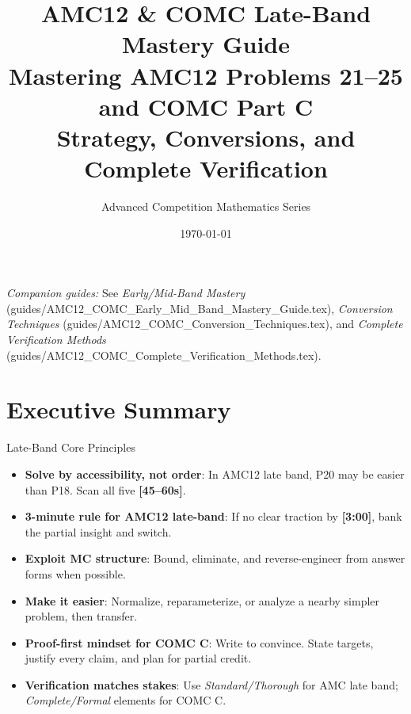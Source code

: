 \documentclass{article}
\title{\textbf{AMC12 \& COMC Late-Band Mastery Guide}\\
\Large Mastering AMC12 Problems 21--25 and COMC Part C\\
\large Strategy, Conversions, and Complete Verification}
\author{Advanced Competition Mathematics Series}
\date{\today}
\newcommand{\timetarget}[1]{\textcolor{timingblue}{\textbf{[#1]}}}
\begin{document}
\maketitle

\begin{center}
\end{center}

\vspace{0.5em}
\noindent\textit{Companion guides:} See \emph{Early/Mid-Band Mastery} (guides/AMC12\_COMC\_Early\_Mid\_Band\_Mastery\_Guide.tex), \emph{Conversion Techniques} (guides/AMC12\_COMC\_Conversion\_Techniques.tex), and \emph{Complete Verification Methods} (guides/AMC12\_COMC\_Complete\_Verification\_Methods.tex).

\tableofcontents
\newpage

\section{Executive Summary}

\begin{strategybox}{Late-Band Core Principles}
\begin{itemize}[nosep]
\item \textbf{Solve by accessibility, not order}: In AMC12 late band, P20 may be easier than P18. Scan all five \timetarget{45--60s}.
\item \textbf{3-minute rule for AMC12 late-band}: If no clear traction by \timetarget{3:00}, bank the partial insight and switch.
\item \textbf{Exploit MC structure}: Bound, eliminate, and reverse-engineer from answer forms when possible.
\item \textbf{Make it easier}: Normalize, reparameterize, or analyze a nearby simpler problem, then transfer.
\item \textbf{Proof-first mindset for COMC C}: Write to convince. State targets, justify every claim, and plan for partial credit.
\item \textbf{Verification matches stakes}: Use \emph{Standard/Thorough} for AMC late band; \emph{Complete/Formal} elements for COMC C.
\end{itemize}
\end{strategybox}
\end{document}
